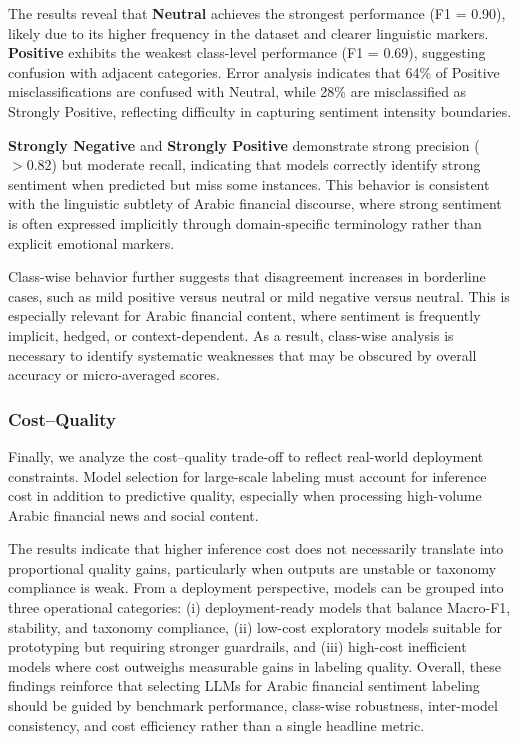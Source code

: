\documentclass[10pt,a4paper]{article}
\begin{document}
The results reveal that \textbf{Neutral} achieves the strongest performance (F1 = 0.90), likely due to its higher frequency in the dataset and clearer linguistic markers. \textbf{Positive} exhibits the weakest class-level performance (F1 = 0.69), suggesting confusion with adjacent categories. Error analysis indicates that 64\% of Positive misclassifications are confused with Neutral, while 28\% are misclassified as Strongly Positive, reflecting difficulty in capturing sentiment intensity boundaries.

\textbf{Strongly Negative} and \textbf{Strongly Positive} demonstrate strong precision ($>0.82$) but moderate recall, indicating that models correctly identify strong sentiment when predicted but miss some instances. This behavior is consistent with the linguistic subtlety of Arabic financial discourse, where strong sentiment is often expressed implicitly through domain-specific terminology rather than explicit emotional markers.

Class-wise behavior further suggests that disagreement increases in borderline cases, such as mild positive versus neutral or mild negative versus neutral. This is especially relevant for Arabic financial content, where sentiment is frequently implicit, hedged, or context-dependent. As a result, class-wise analysis is necessary to identify systematic weaknesses that may be obscured by overall accuracy or micro-averaged scores.

\subsubsection{Cost--Quality}
Finally, we analyze the cost--quality trade-off to reflect real-world deployment constraints. Model selection for large-scale labeling must account for inference cost in addition to predictive quality, especially when processing high-volume Arabic financial news and social content.

The results indicate that higher inference cost does not necessarily translate into proportional quality gains, particularly when outputs are unstable or taxonomy compliance is weak. From a deployment perspective, models can be grouped into three operational categories: (i) deployment-ready models that balance Macro-F1, stability, and taxonomy compliance, (ii) low-cost exploratory models suitable for prototyping but requiring stronger guardrails, and (iii) high-cost inefficient models where cost outweighs measurable gains in labeling quality. Overall, these findings reinforce that selecting LLMs for Arabic financial sentiment labeling should be guided by benchmark performance, class-wise robustness, inter-model consistency, and cost efficiency rather than a single headline metric.
\end{document}
